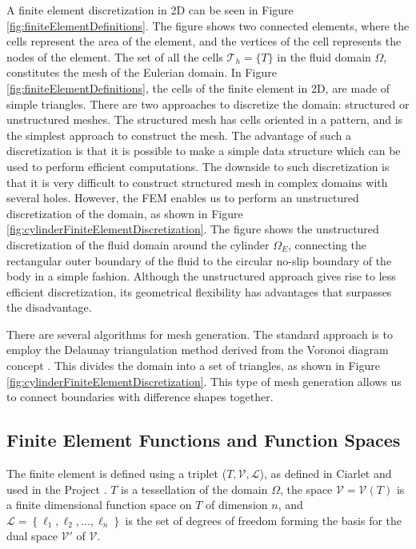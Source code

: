 A finite element discretization in 2D can be seen in Figure \ref{fig:finiteElementDefinitions}. The figure shows two connected elements, where the cells represent the area of the element, and the vertices of the cell represents the nodes of the element. The set of all the cells $\mathcal{T}_h = \{T\}$ in the fluid domain $\Omega$, constitutes the mesh of the Eulerian domain. In Figure \ref{fig:finiteElementDefinitions}, the cells of the finite element in 2D, are made of simple triangles. There are two approaches to discretize the domain: structured or unstructured meshes. The structured mesh has cells oriented in a pattern, and is the simplest approach to construct the mesh. The advantage of such a discretization is that it is possible to make a simple data structure which can be used to perform efficient computations. The downside to such discretization is that it is very difficult to construct structured mesh in complex domains with several holes. However, the FEM enables us to perform an unstructured discretization of the domain, as shown in Figure \ref{fig:cylinderFiniteElementDiscretization}. The figure shows the unstructured discretization of the fluid domain around the cylinder $\Omega_E$, connecting the rectangular outer boundary of the fluid to the circular no-slip boundary of the body in a simple fashion. Although the unstructured approach gives rise to less efficient discretization, its geometrical flexibility has advantages that surpasses the disadvantage.%

There are several algorithms for mesh generation. The standard approach is to employ the Delaunay triangulation method derived from the Voronoi diagram concept \cite{Carey1997}. This divides the domain into a set of triangles, as shown in Figure \ref{fig:cylinderFiniteElementDiscretization}. This type of mesh generation allows us to connect boundaries with difference shapes together. %

\subsection{Finite Element Functions and Function Spaces}

The finite element is defined using a triplet ($T, \mathcal{V}, \mathcal{L}$), as defined in Ciarlet \cite{Ciarlet1972b} and used in the \fenics Project \cite{Logg2012b}. $T$ is a tessellation of the domain $\Omega$, the space $\mathcal{V} = \mathcal{V}(T)$ is a finite dimensional function space on $T$ of dimension $n$, and $\mathcal{L} = \left\{ \ell_1,\ell_2,...,\ell_n \right\}$ is the set of degrees of freedom forming the basis for the dual space $\mathcal{V}'$ of $\mathcal{V}$.

